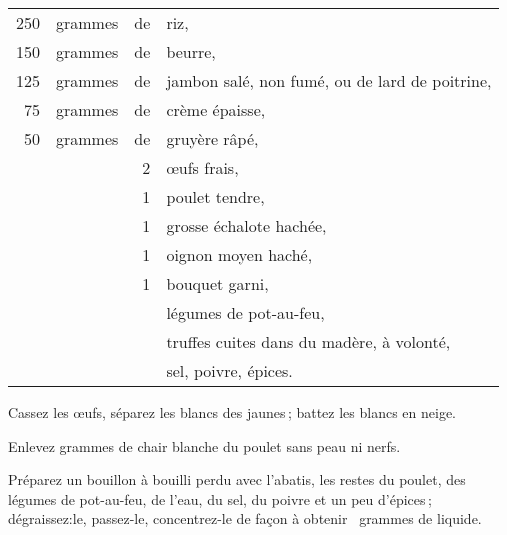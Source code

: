 \footnotesize
\begin{longtable}{rrrp{16em}}
    250 & grammes & de & riz,                                                                             \\
    150 & grammes & de & beurre,                                                                          \\
    125 & grammes & de & jambon salé, non fumé, ou de lard de poitrine,                                   \\
     75 & grammes & de & crème épaisse,                                                                   \\
     50 & grammes & de & gruyère râpé,                                                                    \\
        &         &  2 & œufs frais,                                                                      \\
        &         &  1 & poulet tendre,                                                                   \\
        &         &  1 & grosse échalote hachée,                                                          \\
        &         &  1 & oignon moyen haché,                                                              \\
        &         &  1 & bouquet garni,                                                                   \\
        &         &    & légumes de pot-au-feu,                                                           \\
        &         &    & truffes cuites dans du madère, à volonté,                                        \\
        &         &    & sel, poivre, épices.                                                             \\
\end{longtable}
\normalsize

Cassez les œufs, séparez les blancs des jaunes ; battez les blancs en neige.

Enlevez {\mmm} grammes de chair blanche du poulet sans peau ni nerfs.

Préparez un bouillon à bouilli perdu avec l'abatis, les restes du poulet, des
légumes de pot-au-feu, de l'eau, du sel, du poivre et un peu d'épices ;
dégraissez:le, passez-le, concentrez-le de façon à obtenir
{\mmm} {\mmm} grammes de liquide.

